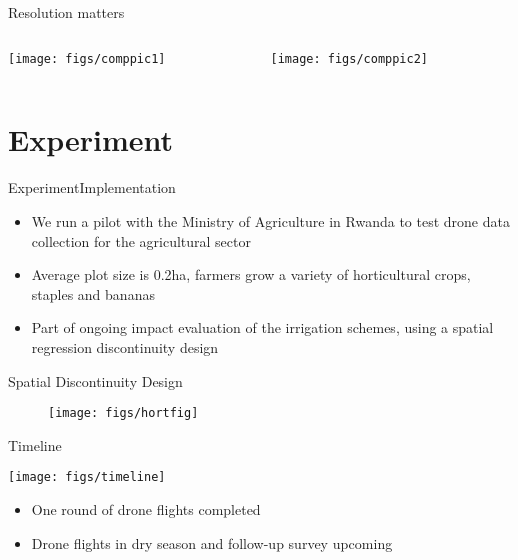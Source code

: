 \documentclass{beamer}
\begin{document}
\begin{frame}{Resolution matters}
\begin{columns}
	\begin{column}{0.5\textwidth}
		\begin{center}
			\texttt{[image: figs/comppic1]}
		\end{center}
	\end{column}
	\begin{column}{0.5\textwidth}
		\begin{center}
			\texttt{[image: figs/comppic2]}
		\end{center}
	\end{column}
\end{columns}
\end{frame}
\section{Experiment}

\begin{frame}{Experiment}{Implementation}
	\begin{itemize}
		\item We run a pilot with the Ministry of Agriculture in Rwanda to test drone data collection for the agricultural sector
		\item Average plot size is 0.2ha, farmers grow a variety of horticultural crops, staples and bananas
		\item Part of ongoing impact evaluation of the irrigation schemes, using a spatial regression discontinuity design
	\end{itemize}
\end{frame}


\begin{frame}{Spatial Discontinuity Design}
	\begin{figure}
		\centering
		\texttt{[image: figs/hortfig]}
	\end{figure}
\end{frame}


\begin{frame}{Timeline}
	\begin{center}
		\texttt{[image: figs/timeline]}
	\end{center}
	\begin{itemize}
		\item One round of drone flights completed
		\item Drone flights in dry season and follow-up survey upcoming
	\end{itemize}
\end{frame}
	
\end{document}
